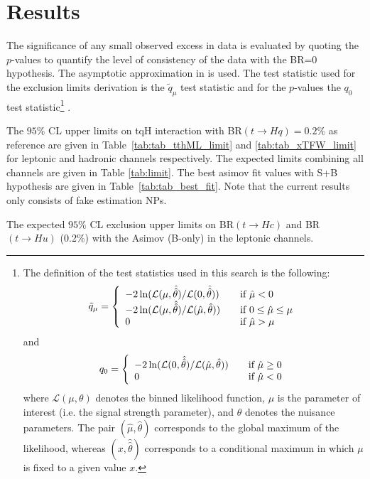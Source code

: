 \section{Results}
\label{sec:results}

The significance of any small observed excess in data is evaluated by quoting the $p$-values to quantify the level of consistency of the data with the BR=0 hypothesis. The asymptotic approximation in \cite{CCGV} is used. The test statistic used for the exclusion limits derivation is the $\tilde{q}_\mu$ test statistic
and for the $p$-values the $q_{0}$ test statistic\footnote{The definition of the test statistics used in this search is the following:
\[ \tilde q_\mu = \left\{
  \begin{array}{l l}
    -2 \ln (\mathcal{L}(\mu,\hat{\hat{\theta}})/\mathcal{L}(0,\hat{\hat\theta})) & \quad \text{if $\hat\mu < 0$}\\
    -2 \ln (\mathcal{L}(\mu,\hat{\hat{\theta}})/\mathcal{L}(\hat \mu,\hat\theta)) & \quad \text{if $0 \leq \hat\mu \leq \mu$}\\
    0 & \quad \text{if $\hat\mu > \mu$}
  \end{array} \right.\]
and
\[ q_0 = \left\{
  \begin{array}{l l}
    -2 \ln (\mathcal{L}(0,\hat{\hat{\theta}})/\mathcal{L}(\hat\mu,\hat\theta)) &\quad \text{if $\hat\mu \geq 0$}\\
    0 & \quad \text{if $\hat\mu <0$}
  \end{array} \right.\]
where $\mathcal L(\mu,\theta)$ denotes the binned likelihood function, $\mu$ is the parameter of interest (i.e.
the signal strength parameter), and $\theta$ denotes the nuisance parameters. The pair $(\hat\mu, \hat\theta)$
corresponds to the global maximum of the likelihood, whereas $(x, \hat{\hat\theta})$ corresponds to a conditional
maximum in which $\mu$ is fixed to a given value $x$.
}
\cite{CCGV}.

The $95\%$ CL upper limits on tqH interaction with BR$(t\to Hq)=0.2\%$ as reference are given in Table~\ref{tab:tab_tthML_limit} and \ref{tab:tab_xTFW_limit} for leptonic and hadronic channels respectively. The expected limits combining all channels are given in Table \ref{tab:limit}. The best asimov fit values with S+B hypothesis are given in Table~\ref{tab:tab_best_fit}. Note that the current results only consists of fake estimation NPs.

\begin{table}[htb]
\caption{ The expected $95\%$ CL exclusion upper limits on BR$(t\to Hc)$ and BR$(t\to Hu)$ (0.2\%) with the Asimov (B-only) in the leptonic channels.}

\label{tab:tab_tthML_limit}
\end{table}

